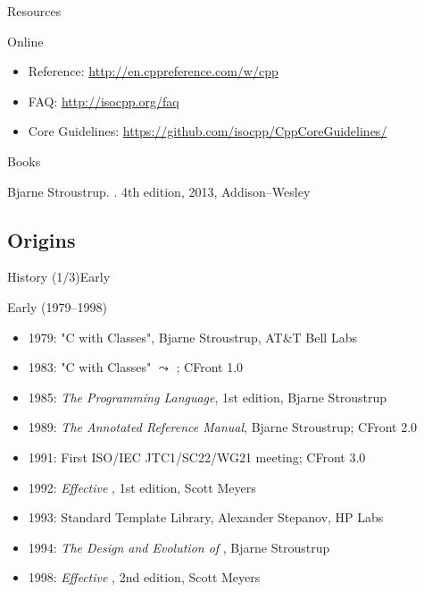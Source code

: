 \begin{frame}{Resources}{}
  \begin{block}{Online}
    \begin{itemize}
    \item
      \CCLang Reference: \url{http://en.cppreference.com/w/cpp}
    \item
      \CCLang FAQ: \url{http://isocpp.org/faq}
    \item
      \CCLang Core Guidelines: \url{https://github.com/isocpp/CppCoreGuidelines/}
    \end{itemize}
  \end{block}

  \begin{block}{Books}
    \begin{thebibliography}{}
      Bjarne Stroustrup.
      .
      \newblock 4th edition, 2013, Addison--Wesley
    \end{thebibliography}
  \end{block}
\end{frame}

\subsection{\CCLang Origins}


\begin{frame}{\CCLang History (1/3)}{Early \CCLang}
  \begin{block}{Early \CCLang (1979--1998)}
    \begin{itemize}
    \item
      1979: "C with Classes", Bjarne Stroustrup, AT\&T Bell Labs
    \item
      1983: "C with Classes" $\leadsto$ \CCLang; CFront 1.0
    \item
      1985: \emph{The \CCLang Programming Language}, 1st edition, Bjarne Stroustrup
    \item
      1989: \emph{The Annotated \CCLang Reference Manual}, Bjarne Stroustrup; CFront 2.0
    \item
      1991: First ISO/IEC JTC1/SC22/WG21 meeting; CFront 3.0
    \item
      1992: \emph{Effective \CCLang}, 1st edition, Scott Meyers
    \item
      1993: Standard Template Library, Alexander Stepanov, HP Labs
    \item
      1994: \emph{The Design and Evolution of \CCLang}, Bjarne Stroustrup
    \item
      1998: \emph{Effective \CCLang}, 2nd edition, Scott Meyers
    \end{itemize}
  \end{block}
\end{frame}

